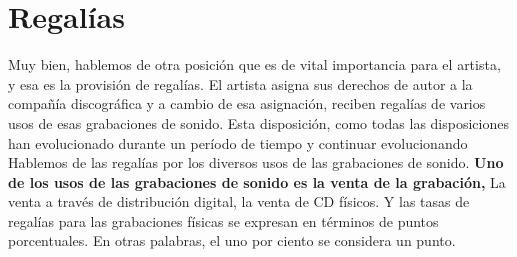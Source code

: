 \documentclass[10pt]{book}
\begin{document}
\section{Regalías}
Muy bien, hablemos de otra posición que es de vital importancia para el artista, y esa es la provisión de regalías. El artista asigna sus derechos de autor a la compañía discográfica y a cambio de esa asignación, reciben regalías de varios usos de esas grabaciones de sonido. Esta disposición, como todas las disposiciones han evolucionado durante un período de tiempo y continuar evolucionando\\
Hablemos de las regalías por los diversos usos de las grabaciones de sonido. \textbf{Uno de los usos de las grabaciones de sonido es la venta de la grabación,} La venta a través de distribución digital, la venta de CD físicos. Y las tasas de regalías para las grabaciones físicas se expresan en términos de puntos porcentuales. En otras palabras, el uno por ciento se considera un punto.\\
\end{document}
